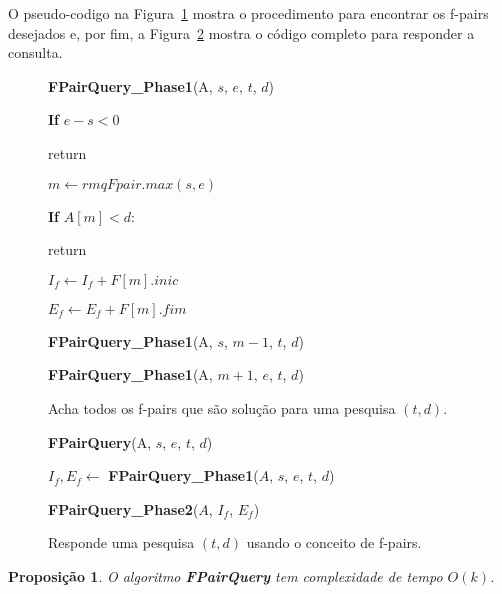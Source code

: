 \documentclass[12pt]{article}
\newtheorem{prop}[thm]{Proposição}
\begin{document}
O pseudo-codigo na Figura~\ref{fpairqueryphase1} mostra o procedimento para encontrar
os f-pairs desejados e, por fim, a Figura~\ref{fpairquery} mostra o código completo
para responder a consulta.

\clearpage
\begin{figure}
\begin{framed}
{\bf FPairQuery\_Phase1}(A, $s$, $e$, $t$, $d$)

\hspace{1cm} {\bf If} $e - s < 0$

\hspace{2cm} return

\hspace{1cm} $m \leftarrow rmqFpair.max(s, e)$

\hspace{1cm} {\bf If} $A[m] < d$:

\hspace{2cm} return

\hspace{1cm} $I_f \leftarrow I_f + F[m].inic$

\hspace{1cm} $E_f \leftarrow E_f + F[m].fim$

\hspace{1cm} {\bf FPairQuery\_Phase1}(A, $s$, $m - 1$, $t$, $d$)

\hspace{1cm} {\bf FPairQuery\_Phase1}(A, $m + 1$, $e$, $t$, $d$)

\caption{Acha todos os f-pairs que são solução para uma pesquisa $(t, d)$.}
\label{fpairqueryphase1}
\end{framed}
\end{figure}


\begin{figure}
\begin{framed}
{\bf FPairQuery}(A, $s$, $e$, $t$, $d$)

\hspace{1cm} $I_f, E_f \leftarrow$ {\bf FPairQuery\_Phase1}($A$, $s$, $e$, $t$, $d$)

\hspace{1cm} {\bf FPairQuery\_Phase2}($A$, $I_f$, $E_f$)

\caption{Responde uma pesquisa $(t, d)$ usando o conceito de f-pairs.}
\label{fpairquery}
\end{framed}
\end{figure}

\begin{prop}
O algoritmo {\bf FPairQuery} tem complexidade de tempo $O(k)$.
\end{prop}
\end{document}
